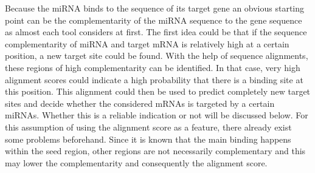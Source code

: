 \documentclass[12pt]{article}
\begin{document}
Because the miRNA binds to the sequence of its target gene an obvious starting point can be the complementarity of the miRNA sequence to the gene sequence as almost each tool considers at first. The first idea could be that if the sequence complementarity of miRNA and target mRNA is relatively high at a certain position, a new target site could be found. With the help of sequence alignments, these regions of high complementarity can be identified. In that case, very high alignment scores could indicate a high probability that there is a binding site at this position. This alignment could then be used to predict completely new target sites and decide whether the considered mRNAs is targeted by a certain miRNAs. Whether this is a reliable indication or not will be discussed below. For this assumption of using the alignment score as a feature, there already exist some problems beforehand. Since it is known that the main binding happens within the seed region, other regions are not necessarily complementary and this may lower the complementarity and consequently the alignment score. \\\\
\end{document}
